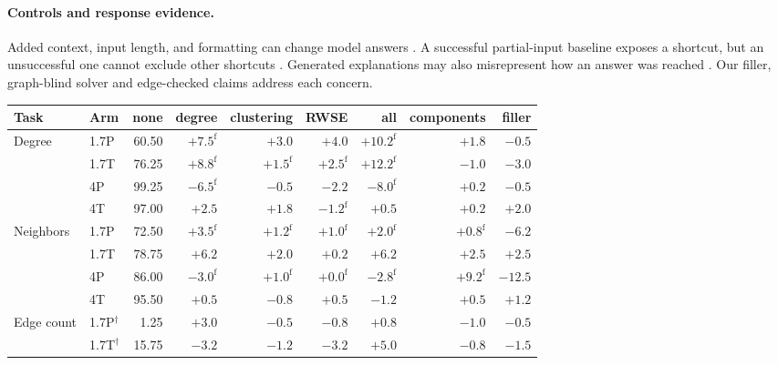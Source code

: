 \documentclass[11pt]{article}
\begin{document}
\paragraph{Controls and response evidence.} Added context, input length, and formatting can change model answers \citep{shi2023distracted,levy2024sametask,sclar2024quantifying}. A successful partial-input baseline exposes a shortcut, but an unsuccessful one cannot exclude other shortcuts \citep{feng2019misleading}. Generated explanations may also misrepresent how an answer was reached \citep{turpin2023unfaithful}. Our filler, graph-blind solver and edge-checked claims address each concern.

\begin{table}[t]
\centering\scriptsize
\setlength{\tabcolsep}{3.4pt}
\begin{tabular}{llrrrrrrr}
\toprule
Task & Arm & none & degree & clustering & RWSE & all & components & filler\\
\midrule
Degree & 1.7P & 60.50 & $\mathbf{+7.5}^{\mathrm{f}}$ & $+3.0$ & $+4.0$ & $\mathbf{+10.2}^{\mathrm{f}}$ & $+1.8$ & $-0.5$\\ %
 & 1.7T & 76.25 & $\mathbf{+8.8}^{\mathrm{f}}$ & $+1.5^{\mathrm{f}}$ & $+2.5^{\mathrm{f}}$ & $\mathbf{+12.2}^{\mathrm{f}}$ & $-1.0$ & $-3.0$\\ %
 & 4P & 99.25 & $\mathbf{-6.5}^{\mathrm{f}}$ & $-0.5$ & $\mathbf{-2.2}$ & $\mathbf{-8.0}^{\mathrm{f}}$ & $+0.2$ & $-0.5$\\ %
 & 4T & 97.00 & $+2.5$ & $+1.8$ & $-1.2^{\mathrm{f}}$ & $+0.5$ & $+0.2$ & $+2.0$\\ %
\midrule
Neighbors & 1.7P & 72.50 & $+3.5^{\mathrm{f}}$ & $+1.2^{\mathrm{f}}$ & $+1.0^{\mathrm{f}}$ & $+2.0^{\mathrm{f}}$ & $+0.8^{\mathrm{f}}$ & $\mathbf{-6.2}$\\ %
 & 1.7T & 78.75 & $\mathbf{+6.2}$ & $+2.0$ & $+0.2$ & $\mathbf{+6.2}$ & $+2.5$ & $+2.5$\\ %
 & 4P & 86.00 & $-3.0^{\mathrm{f}}$ & $+1.0^{\mathrm{f}}$ & $+0.0^{\mathrm{f}}$ & $-2.8^{\mathrm{f}}$ & $\mathbf{+9.2}^{\mathrm{f}}$ & $\mathbf{-12.5}$\\ %
 & 4T & 95.50 & $+0.5$ & $-0.8$ & $+0.5$ & $-1.2$ & $+0.5$ & $+1.2$\\ %
\midrule
Edge count & 1.7P$^{\dagger}$ & 1.25 & $+3.0$ & $-0.5$ & $-0.8$ & $+0.8$ & $-1.0$ & $-0.5$\\ %
 & 1.7T$^{\dagger}$ & 15.75 & $-3.2$ & $-1.2$ & $-3.2$ & $+5.0$ & $-0.8$ & $-1.5$\\ %

\end{tabular}
\end{table}
\end{document}
